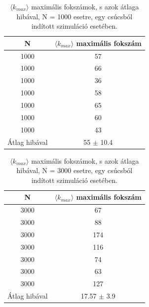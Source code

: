 \documentclass[a4paper, 12pt]{article}
\numberwithin{equation}{section}          %
\numberwithin{figure}{subsection}
\begin{document}
\begin{table}[ht!]
	\captionsetup{justification=centering}
	\begin{center}
		\begin{tabular}{||c|c||}
			\hline
			N & $\langle k_{max} \rangle$ maximális fokszám \\  \hline
			1000 & 57 \\	\hline
			1000 &66 \\	\hline
			1000 &36\\	\hline
			1000 & 58\\	\hline
			1000 & 65\\	\hline
			1000 & 60\\	\hline
			1000 & 43 \\	\hline
			Átlag hibával & 55 $\pm$ 10.4\\  \hline
		\end{tabular}
		\caption{$\langle k_{max} \rangle$ maximális fokszámok, s azok átlaga hibával, N = 1000 esetre, egy csúcsból indított
			szimuláció esetében.}
	\end{center}
\end{table}




\begin{table}[ht!]
	\captionsetup{justification=centering}
	\begin{center}
		\begin{tabular}{||c|c||}
			\hline
			N & $\langle k_{max} \rangle$ maximális fokszám \\  \hline
			3000 & 67 \\	\hline
			3000 &88 \\	\hline
			3000 & 174\\	\hline
			3000 & 116\\	\hline
			3000 & 74\\	\hline
			3000 & 63\\	\hline
			3000 & 127 \\	\hline
			Átlag hibával & 17.57 $\pm$ 3.9\\  \hline
		\end{tabular}
		\caption{$\langle k_{max} \rangle$ maximális fokszámok, s azok átlaga hibával, N = 3000 esetre, egy csúcsból indított
			szimuláció esetében.}
	\end{center}
\end{table}
\end{document}
